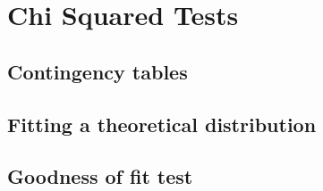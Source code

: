 \chapter{Chi Squared Tests}

\section{Contingency tables}
\section{Fitting a theoretical distribution}
\section{Goodness of fit test}